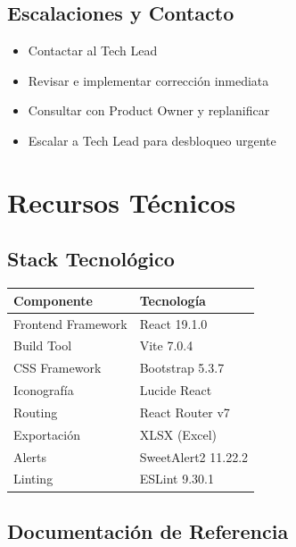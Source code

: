 \documentclass[12pt,a4paper]{report}
\begin{document}
\section{Escalaciones y Contacto}

\begin{itemize}
    \item[\textbf{Problemas Técnicos}] Contactar al Tech Lead
    \item[\textbf{Defectos Críticos}] Revisar e implementar corrección inmediata
    \item[\textbf{Cambios de Scope}] Consultar con Product Owner y replanificar
    \item[\textbf{Bloqueos}] Escalar a Tech Lead para desbloqueo urgente
\end{itemize}

\chapter{Recursos Técnicos}

\section{Stack Tecnológico}

\begin{table}[h]
    \centering
    \begin{tabular}{|l|l|}
        \hline
        \rowcolor{grisClaro}
        \textbf{Componente} & \textbf{Tecnología} \\
        \hline
        Frontend Framework & React 19.1.0 \\
        \hline
        Build Tool & Vite 7.0.4 \\
        \hline
        CSS Framework & Bootstrap 5.3.7 \\
        \hline
        Iconografía & Lucide React \\
        \hline
        Routing & React Router v7 \\
        \hline
        Exportación & XLSX (Excel) \\
        \hline
        Alerts & SweetAlert2 11.22.2 \\
        \hline
        Linting & ESLint 9.30.1 \\
        \hline
    \end{tabular}
\end{table}

\section{Documentación de Referencia}
\end{document}
